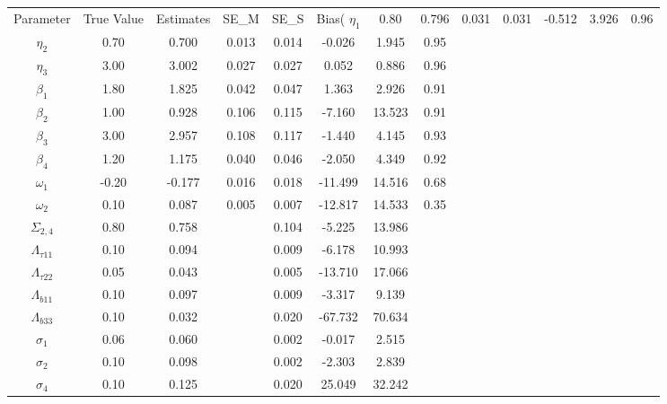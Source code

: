 \begin{table}[ht]
\centering
\begin{tabular}{cccccccc}
  \hline
Parameter & True Value & Estimates & SE_M & SE_S & Bias(%
  \hline
\hline
$\eta_1$ & 0.80 & 0.796 & 0.031 & 0.031 & -0.512 & 3.926 & 0.96 \\ 
  $\eta_2$ & 0.70 & 0.700 & 0.013 & 0.014 & -0.026 & 1.945 & 0.95 \\ 
  $\eta_3$ & 3.00 & 3.002 & 0.027 & 0.027 & 0.052 & 0.886 & 0.96 \\ 
  $\beta_1$ & 1.80 & 1.825 & 0.042 & 0.047 & 1.363 & 2.926 & 0.91 \\ 
  $\beta_2$ & 1.00 & 0.928 & 0.106 & 0.115 & -7.160 & 13.523 & 0.91 \\ 
  $\beta_3$ & 3.00 & 2.957 & 0.108 & 0.117 & -1.440 & 4.145 & 0.93 \\ 
  $\beta_4$ & 1.20 & 1.175 & 0.040 & 0.046 & -2.050 & 4.349 & 0.92 \\ 
  $\omega_1$ & -0.20 & -0.177 & 0.016 & 0.018 & -11.499 & 14.516 & 0.68 \\ 
  $\omega_2$ & 0.10 & 0.087 & 0.005 & 0.007 & -12.817 & 14.533 & 0.35 \\ 
   \hline
$\Sigma_{2,4}$ & 0.80 & 0.758 &  & 0.104 & -5.225 & 13.986 &  \\ 
  $\Lambda_{\tau11}$ & 0.10 & 0.094 &  & 0.009 & -6.178 & 10.993 &  \\ 
  $\Lambda_{\tau22}$ & 0.05 & 0.043 &  & 0.005 & -13.710 & 17.066 &  \\ 
  $\Lambda_{b11}$ & 0.10 & 0.097 &  & 0.009 & -3.317 & 9.139 &  \\ 
  $\Lambda_{b33}$ & 0.10 & 0.032 &  & 0.020 & -67.732 & 70.634 &  \\ 
  $\sigma_1$ & 0.06 & 0.060 &  & 0.002 & -0.017 & 2.515 &  \\ 
  $\sigma_2$ & 0.10 & 0.098 &  & 0.002 & -2.303 & 2.839 &  \\ 
  $\sigma_4$ & 0.10 & 0.125 &  & 0.020 & 25.049 & 32.242 &  \\ 
  \end{tabular}
\end{table}
